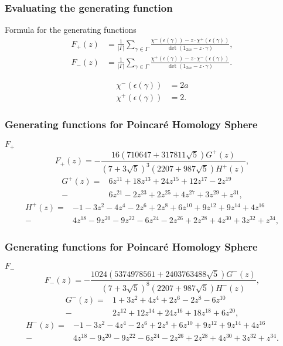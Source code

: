 \documentclass{beamer}
\begin{document}
\begin{frame}
\frametitle{Evaluating the generating function}
	\begin{block}{Formula for the generating functions}
		\begin{align*}
F_+ (z) &= \frac{1}{| \Gamma |} \sum_{\gamma \in \Gamma}  \frac{\chi^-(\epsilon(\gamma)) - z \cdot \chi^+ (\epsilon(\gamma))}{\det(1_{2m} - z \cdot \gamma)}, \\ \label{Spmultgen2}
F_-(z) &= \frac{1}{| \Gamma |} \sum_{\gamma \in \Gamma} \frac{\chi^+(\epsilon(\gamma)) - z \cdot \chi^- (\epsilon(\gamma))}{\det(1_{2m} - z \cdot \gamma)}.
		\end{align*}

		\begin{align*}
			\chi^- (\epsilon(\gamma)) &= 2a \\
			\chi^+ (\epsilon(\gamma)) &= 2.
		\end{align*}
	\end{block}
\end{frame}

\begin{frame}
	\frametitle{Generating functions for Poincar\'e Homology Sphere}
	\begin{block}{$F_+$}
	\[
F_+(z) = -\frac{16(710647 + 317811 \sqrt{5})G^+(z)}{(7 + 3 \sqrt{5})^3 (2207 + 987 \sqrt{5})H^+(z)},
\]
{\small
$$ \begin{array}{rl}
G^+(z) =&  6z^{11} + 18z^{13} + 24z^{15} + 12z^{17} - 2z^{19} \\[2mm]
- & 6z^{21} - 2z^{23} + 2 z^{25} + 4z^{27} + 3z^{29} + z^{31},
\end{array} $$
$$ \begin{array}{rl}
H^+(z) = & -1 -3 z^{2}  -4z^{4}-2z^{6}+2z^{8}+ 6z^{10} + 9z^{12} + 9z^{14} + 4 z^{16}\\[2mm]
- &  4 z^{18} - 9 z^{20} -9z^{22}-6z^{24}-2z^{26} + 2z^{28} + 4z^{30} + 3z^{32} + z^{34},
\end{array}
$$}
	\end{block}
\end{frame}

\begin{frame}
	\frametitle{Generating functions for Poincar\'e Homology Sphere}
	\begin{block}{$F_-$}
\[
F_-(z) = -\frac{1024(5374978561 + 2403763488  \sqrt{5})G^-(z)}{(7 + 3 \sqrt{5})^8 (2207 + 987 \sqrt{5})H^-(z)},
\]
{\small
$$ \begin{array}{rl}
G^-(z) = & 1 + 3z^{2} + 4z^{4} + 2z^{6} - 2z^{8}-6z^{10} \\[2mm]
- & 2z^{12} + 12 z^{14} + 24z^{16} + 18z^{18} + 6z^{20},
\end{array}
$$
$$ \begin{array}{rl}
H^-(z) = & -1 -3 z^{2}  -4z^{4}-2z^{6}+2z^{8}+ 6z^{10} + 9z^{12} + 9z^{14} + 4 z^{16}
\\[2mm] - & 4 z^{18}  - 9 z^{20} - 9z^{22}-6z^{24}-2z^{26} + 2z^{28} + 4z^{30} + 3z^{32} + z^{34}. \end{array} $$}
	\end{block}
\end{frame}
\end{document}

